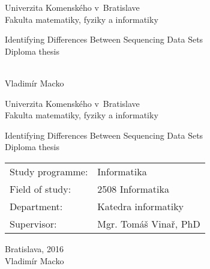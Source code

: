 \documentclass[12pt, oneside]{book}
\def\mfrok{2016}
\def\mfnazov{Identifying Differences Between Sequencing Data Sets}
\def\mftyp{Diploma thesis}
\def\mfautor{Vladimír Macko}
\def\mfskolitel{Mgr. Tomáš Vinař, PhD}
\def\mfmiesto{Bratislava, \mfrok}
\def\mfodbor{2508 Informatika}
\def\program{ Informatika }
\def\mfpracovisko{ Katedra informatiky }
\begin{document}
     

\thispagestyle{empty}

\begin{center}
\sc\large
Univerzita Komenského v~Bratislave\\
Fakulta matematiky, fyziky a informatiky

\vfill

{\LARGE\mfnazov}\\
\mftyp
\end{center}

\vfill

{\sc\large 
\noindent \mfrok\\
\mfautor
}

\eject %


\thispagestyle{empty}
\noindent

\begin{center}
\sc  
\large
Univerzita Komenského v~Bratislave\\
Fakulta matematiky, fyziky a informatiky

\vfill

{\LARGE\mfnazov}\\
\mftyp
\end{center}

\vfill

\noindent
\begin{tabular}{ll}
Study programme: & \program \\
Field of study: & \mfodbor \\
Department: & \mfpracovisko \\
Supervisor: & \mfskolitel \\
\end{tabular}

\vfill


\noindent \mfmiesto\\
\mfautor

\eject %





\newpage 
\thispagestyle{empty}
\end{document}
